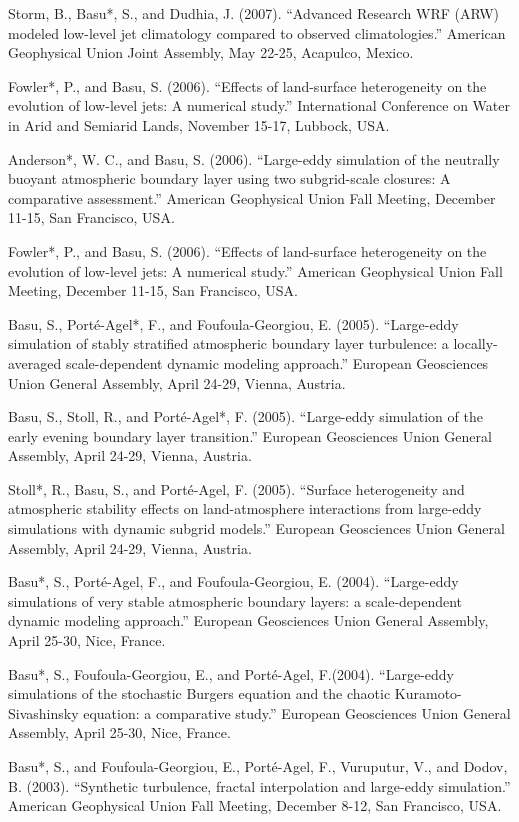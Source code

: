 \begin{etaremune}[topsep=0pt,itemsep=0pt,partopsep=0pt,parsep=0pt]
\item Storm, B., Basu*, S., and Dudhia, J. (2007). ``Advanced Research WRF (ARW) modeled low-level jet climatology compared to observed climatologies.'' American Geophysical Union Joint Assembly, May 22-25, Acapulco, Mexico.
\item Fowler*, P., and Basu, S. (2006). ``Effects of land-surface heterogeneity on the evolution of low-level jets: A numerical study.'' International Conference on Water in Arid and Semiarid Lands, November 15-17, Lubbock, USA. 
\item Anderson*, W. C., and Basu, S. (2006). ``Large-eddy simulation of the neutrally buoyant atmospheric boundary layer using two subgrid-scale closures: A comparative assessment.'' American Geophysical Union Fall Meeting, December 11-15, San Francisco, USA. 
\item Fowler*, P., and Basu, S. (2006). ``Effects of land-surface heterogeneity on the evolution of low-level jets: A numerical study.'' American Geophysical Union Fall Meeting, December 11-15, San Francisco, USA. 
\item Basu, S., Porté-Agel*, F., and Foufoula-Georgiou, E. (2005). ``Large-eddy simulation of stably stratified atmospheric boundary layer turbulence: a locally-averaged scale-dependent dynamic modeling approach.'' European Geosciences Union General Assembly, April 24-29, Vienna, Austria.
\item Basu, S., Stoll, R., and Porté-Agel*, F. (2005). ``Large-eddy simulation of the early evening boundary layer transition.'' European Geosciences Union General Assembly, April 24-29, Vienna, Austria.
\item Stoll*, R., Basu, S., and Porté-Agel, F. (2005). ``Surface heterogeneity and atmospheric stability effects on land-atmosphere interactions from large-eddy simulations with dynamic subgrid models.'' European Geosciences Union General Assembly, April 24-29, Vienna, Austria.
\item Basu*, S., Porté-Agel, F., and Foufoula-Georgiou, E. (2004). ``Large-eddy simulations of very stable atmospheric boundary layers: a scale-dependent dynamic modeling approach.'' European Geosciences Union General Assembly, April 25-30, Nice, France.
\item Basu*, S., Foufoula-Georgiou, E., and Porté-Agel, F.(2004). ``Large-eddy simulations of the stochastic Burgers equation and the chaotic Kuramoto-Sivashinsky equation: a comparative study.'' European Geosciences Union General Assembly, April 25-30, Nice, France.
\item Basu*, S., and Foufoula-Georgiou, E., Porté-Agel, F., Vuruputur, V., and Dodov, B. (2003). ``Synthetic turbulence, fractal interpolation and large-eddy simulation.'' American Geophysical Union Fall Meeting, December 8-12, San Francisco, USA.

\end{etaremune}
